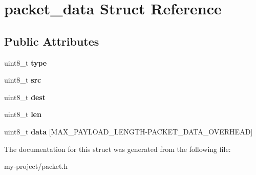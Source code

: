 \hypertarget{structpacket__data}{}\section{packet\+\_\+data Struct Reference}
\label{structpacket__data}
\subsection*{Public Attributes}
\begin{DoxyCompactItemize}
\item 
\mbox{\label{structpacket__data_aba4e14c92d67a5bb25bb5e2c36371a9b}} 
uint8\+\_\+t {\bfseries type}
\item 
\mbox{\label{structpacket__data_a582b9c866532c1b8c29c134a067808d8}} 
uint8\+\_\+t {\bfseries src}
\item 
\mbox{\label{structpacket__data_af3e7c618f3a03ba15fc8790501ba9455}} 
uint8\+\_\+t {\bfseries dest}
\item 
\mbox{\label{structpacket__data_acb35efa6bcd75c619daa0aa9de9ee7d0}} 
uint8\+\_\+t {\bfseries len}
\item 
\mbox{\label{structpacket__data_ae6473a61789f54e3f9c364d7acc5a62d}} 
uint8\+\_\+t {\bfseries data} \mbox{[}M\+A\+X\+\_\+\+P\+A\+Y\+L\+O\+A\+D\+\_\+\+L\+E\+N\+G\+TH-\/P\+A\+C\+K\+E\+T\+\_\+\+D\+A\+T\+A\+\_\+\+O\+V\+E\+R\+H\+E\+AD\mbox{]}
\end{DoxyCompactItemize}


The documentation for this struct was generated from the following file\+:\begin{DoxyCompactItemize}
\item 
my-\/project/packet.\+h\end{DoxyCompactItemize}
